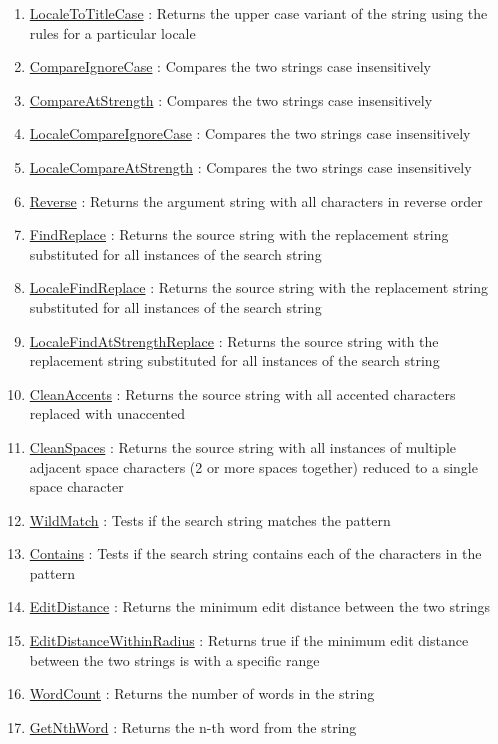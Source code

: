 \begin{enumerate}
\item \hyperlink{ecldoc:uni.localetotitlecase}{LocaleToTitleCase}
: Returns the upper case variant of the string using the rules for a particular locale
\item \hyperlink{ecldoc:uni.compareignorecase}{CompareIgnoreCase}
: Compares the two strings case insensitively
\item \hyperlink{ecldoc:uni.compareatstrength}{CompareAtStrength}
: Compares the two strings case insensitively
\item \hyperlink{ecldoc:uni.localecompareignorecase}{LocaleCompareIgnoreCase}
: Compares the two strings case insensitively
\item \hyperlink{ecldoc:uni.localecompareatstrength}{LocaleCompareAtStrength}
: Compares the two strings case insensitively
\item \hyperlink{ecldoc:uni.reverse}{Reverse}
: Returns the argument string with all characters in reverse order
\item \hyperlink{ecldoc:uni.findreplace}{FindReplace}
: Returns the source string with the replacement string substituted for all instances of the search string
\item \hyperlink{ecldoc:uni.localefindreplace}{LocaleFindReplace}
: Returns the source string with the replacement string substituted for all instances of the search string
\item \hyperlink{ecldoc:uni.localefindatstrengthreplace}{LocaleFindAtStrengthReplace}
: Returns the source string with the replacement string substituted for all instances of the search string
\item \hyperlink{ecldoc:uni.cleanaccents}{CleanAccents}
: Returns the source string with all accented characters replaced with unaccented
\item \hyperlink{ecldoc:uni.cleanspaces}{CleanSpaces}
: Returns the source string with all instances of multiple adjacent space characters (2 or more spaces together) reduced to a single space character
\item \hyperlink{ecldoc:uni.wildmatch}{WildMatch}
: Tests if the search string matches the pattern
\item \hyperlink{ecldoc:uni.contains}{Contains}
: Tests if the search string contains each of the characters in the pattern
\item \hyperlink{ecldoc:uni.editdistance}{EditDistance}
: Returns the minimum edit distance between the two strings
\item \hyperlink{ecldoc:uni.editdistancewithinradius}{EditDistanceWithinRadius}
: Returns true if the minimum edit distance between the two strings is with a specific range
\item \hyperlink{ecldoc:uni.wordcount}{WordCount}
: Returns the number of words in the string
\item \hyperlink{ecldoc:uni.getnthword}{GetNthWord}
: Returns the n-th word from the string
\end{enumerate}

